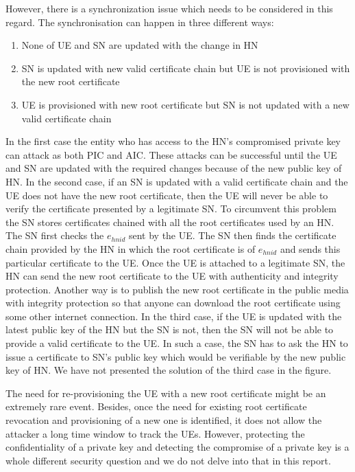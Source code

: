 \documentclass[runningheads,a4paper]{llncs} %
\begin{document}
However, there is a synchronization issue which needs to be considered in this regard. The synchronisation can happen in three different ways: 
\begin{enumerate}
\item None of UE and SN are updated with the change in HN
\item SN is updated with new valid certificate chain but UE is not provisioned with the new root certificate
\item UE is provisioned with new root certificate but SN is not updated with a new valid certificate chain
\end{enumerate} 

In the first case the entity who has access to the HN's compromised private key can attack as both PIC and AIC. These attacks can be successful until the UE and SN are updated with the required changes because of the new public key of HN. In the second case, if an SN is updated with a valid certificate chain and the UE does not have the new root certificate, then the UE will never be able to verify the certificate presented by a legitimate SN. To circumvent this problem the SN stores certificates chained with all the root certificates used by an HN. The SN first checks the $e_{hnid}$ sent by the UE. The SN then finds the certificate chain provided by the HN in which the root certificate is of $e_{hnid}$ and sends this particular certificate to the UE. Once the UE is attached to a legitimate SN, the HN can send the new root certificate to the UE with authenticity and integrity protection. Another way is to publish the new root certificate in the public media with integrity protection so that anyone can download the root certificate using some other internet connection. In the third case, if the UE is updated with the latest public key of the HN but the SN is not, then the SN will not be able to provide a valid certificate to the UE. In such a case, the SN has to ask the HN to issue a certificate to SN's public key which would be verifiable by the new public key of HN. We have not presented the solution of the third case in the figure.

The need for re-provisioning the UE with a new root certificate might be an extremely rare event. Besides, once the need for existing root certificate revocation and provisioning of a new one is identified, it does not allow the attacker a long time window to track the UEs. However, protecting the confidentiality of a private key and detecting the compromise of a private key is a whole different security question and we do not delve into that in this report.
\end{document}
